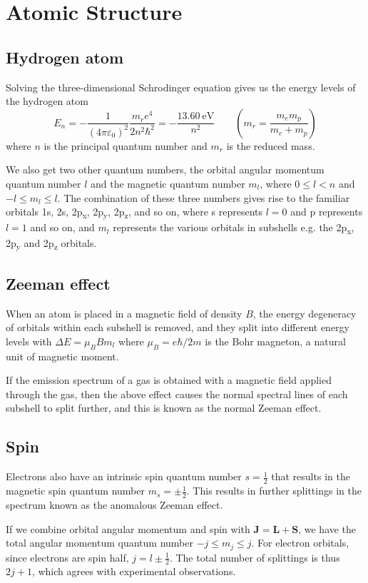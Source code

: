 \chapter{Atomic Structure}
\section{Hydrogen atom}
Solving the three-dimensional Schrodinger equation gives us the energy levels of the hydrogen atom \[E_n=-\frac{1}{(4\pi\varepsilon_0)^2}\frac{m_re^4}{2n^2\hbar^2}=-\frac{\SI{13.60}{\eV}}{n^2} \qquad \left(m_r = \frac{m_em_p}{m_e+m_p}\right)\] where \(n\) is the principal quantum number and \(m_r\) is the reduced mass.

We also get two other quantum numbers, the orbital angular momentum quantum number \(l\) and the magnetic quantum number \(m_l\), where \(0 \leq l < n\) and \(-l \leq m_l \leq l\). The combination of these three numbers gives rise to the familiar orbitals 1s, 2s, 2p\textsubscript{x}, 2p\textsubscript{y}, 2p\textsubscript{z}, and so on, where s represents \(l = 0\) and p represents \(l = 1\) and so on, and \(m_l\) represents the various orbitals in subshells e.g. the 2p\textsubscript{x}, 2p\textsubscript{y} and 2p\textsubscript{z} orbitals.
\section{Zeeman effect}
When an atom is placed in a magnetic field of density \(B\), the energy degeneracy of orbitals within each subshell is removed, and they split into different energy levels with \(\Delta E = \mu_BBm_l\) where \(\mu_B = e\hbar/2m\) is the Bohr magneton, a natural unit of magnetic moment.

If the emission spectrum of a gas is obtained with a magnetic field applied through the gas, then the above effect causes the normal spectral lines of each subshell to split further, and this is known as the normal Zeeman effect.
\section{Spin}
Electrons also have an intrinsic spin quantum number \(s = \frac{1}{2}\) that results in the magnetic spin quantum number \(m_s = \pm \frac{1}{2}\). This results in further splittings in the spectrum known as the anomalous Zeeman effect.

If we combine orbital angular momentum and spin with \(\mathbf{J} = \mathbf{L} + \mathbf{S}\), we have the total angular momentum quantum number \(-j \leq m_j \leq j\). For electron orbitals, since electrons are spin half, \(j = l \pm \frac{1}{2}\). The total number of splittings is thus \(2j + 1\), which agrees with experimental observations.
